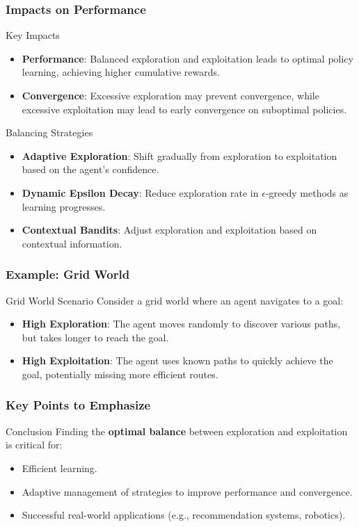\documentclass[aspectratio=169]{beamer}
\begin{document}
\begin{frame}[fragile]
    \frametitle{Impacts on Performance}
    \begin{block}{Key Impacts}
        \begin{itemize}
            \item \textbf{Performance}: Balanced exploration and exploitation leads to optimal policy learning, achieving higher cumulative rewards.
            \item \textbf{Convergence}: Excessive exploration may prevent convergence, while excessive exploitation may lead to early convergence on suboptimal policies.
        \end{itemize}
    \end{block}
    \begin{block}{Balancing Strategies}
        \begin{itemize}
            \item \textbf{Adaptive Exploration}: Shift gradually from exploration to exploitation based on the agent's confidence.
            \item \textbf{Dynamic Epsilon Decay}: Reduce exploration rate in $\epsilon$-greedy methods as learning progresses.
            \item \textbf{Contextual Bandits}: Adjust exploration and exploitation based on contextual information.
        \end{itemize}
    \end{block}
\end{frame}

\begin{frame}[fragile]
    \frametitle{Example: Grid World}
    \begin{block}{Grid World Scenario}
        Consider a grid world where an agent navigates to a goal:
        \begin{itemize}
            \item \textbf{High Exploration}: The agent moves randomly to discover various paths, but takes longer to reach the goal.
            \item \textbf{High Exploitation}: The agent uses known paths to quickly achieve the goal, potentially missing more efficient routes.
        \end{itemize}
    \end{block}
\end{frame}

\begin{frame}[fragile]
    \frametitle{Key Points to Emphasize}
    \begin{block}{Conclusion}
        Finding the \textbf{optimal balance} between exploration and exploitation is critical for:
        \begin{itemize}
            \item Efficient learning.
            \item Adaptive management of strategies to improve performance and convergence.
            \item Successful real-world applications (e.g., recommendation systems, robotics).
        \end{itemize}
    \end{block}
\end{frame}
\end{document}

